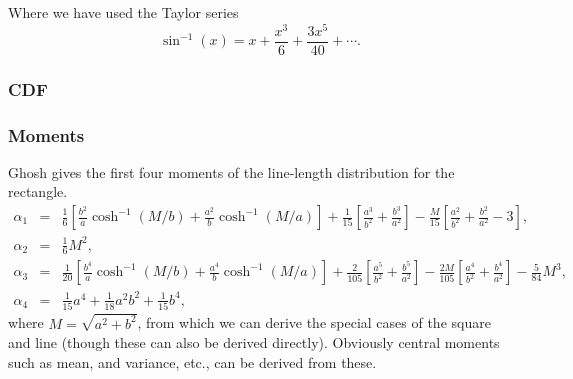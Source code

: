 Where we have used the Taylor series
\[ \sin^{-1}(x) = x + \frac{x^3}{6} + \frac{3 x^5}{40} + \cdots . \]


\subsubsection{CDF}


\subsubsection{Moments}

Ghosh \cite{b.ghosh51:_random_rect} gives the first four moments of
the line-length distribution for the rectangle.
\begin{eqnarray}
  \label{eq:rect_moments} 
  \alpha_1 & = & \frac{1}{6} \left[ 
                        \frac{b^2}{a} \cosh^{-1}\left( M/b \right) +
                        \frac{a^2}{b} \cosh^{-1}\left( M/a \right) 
                 \right]
                  + \frac{1}{15} \left[ \frac{a^3}{b^2} + \frac{b^3}{a^2} \right]
                  - \frac{M}{15} \left[ \frac{a^2}{b^2} + \frac{b^2}{a^2} -3 \right],
\\
  \alpha_2 & = & \frac{1}{6} M^2, \\
  \alpha_3 & = & \frac{1}{20} \left[ 
                        \frac{b^4}{a} \cosh^{-1}\left( M/b \right) +
                        \frac{a^4}{b} \cosh^{-1}\left( M/a \right) 
                 \right]
                  + \frac{2}{105} \left[ \frac{a^5}{b^2} + \frac{b^5}{a^2} \right]
                  - \frac{2M}{105} \left[ \frac{a^4}{b^2} + \frac{b^4}{a^2}\right]
                        - \frac{5}{84} M^3, 
\\
  \alpha_4 & = & \frac{1}{15} a^4 + \frac{1}{18} a^2 b^2 + \frac{1}{15} b^4,
\end{eqnarray}
where $M = \sqrt{a^2 + b^2}$, from which we can derive the special
cases of the square and line (though these can also be derived
directly). Obviously central moments such as mean, and variance, etc.,
can be derived from these. 
